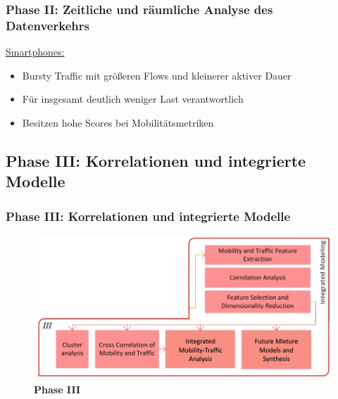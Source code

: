 \documentclass{beamer}
\begin{document}
\begin{frame}
  \frametitle{Phase II: Zeitliche und räumliche Analyse des Datenverkehrs}

  \begin{figure}[H]
    \centering
    \end{figure}

    \underline{Smartphones:}
    \begin{itemize}
      \item Bursty Traffic mit größeren Flows und kleinerer aktiver Dauer
      \item Für insgesamt deutlich weniger Last verantwortlich
      \item Besitzen hohe Scores bei Mobilitätsmetriken
    \end{itemize}
\end{frame}

\subsection{\textbf{Phase III}: Korrelationen und integrierte Modelle}

\begin{frame}
  \frametitle{Phase III: Korrelationen und integrierte Modelle}
  \begin{figure}
    \centering
    \includegraphics[width=\textwidth]{images/phase3.png}
    \caption*{\textbf{Phase III}}
  \end{figure}  
\end{frame}
\end{document}

